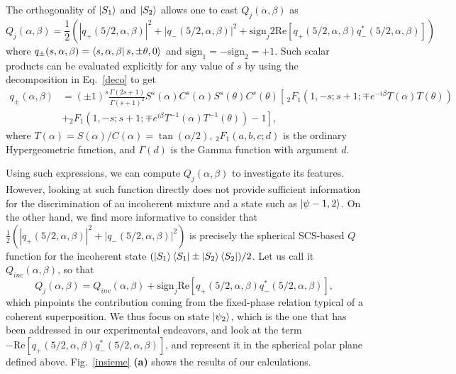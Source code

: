 The orthogonality of $\ket{S_1}$ and $\ket{S_2}$ allows one to cast $Q_j(\alpha,\beta)$ as 
\begin{equation}
Q_j(\alpha,\beta)=\frac12\left(|q_+(5/2,\alpha,\beta)|^2+|q_-(5/2,\alpha,\beta)|^2+\text{sign}_j2\text{Re}[q_+(5/2,\alpha,\beta)q^*_-(5/2,\alpha,\beta)]\right)
\end{equation}
where $q_\pm(s,\alpha,\beta)=\bra{s,\alpha,\beta}{s,\pm\theta,0}\rangle$ and $\text{sign}_1=-\text{sign}_2=+1$. Such scalar products can be evaluated explicitly for any value of $s$ by using the decomposition in Eq.~\eqref{deco} to get 
\begin{equation}
\begin{aligned}
q_\pm(\alpha,\beta)&=(\pm 1)^s\frac{\Gamma (2 s+1)}{\Gamma (s+1)^2} S^s\left({\alpha }\right) C^s\left(\alpha\right) S^s\left(\theta\right) C^s\left({\theta
   }\right) \left[\, _2F_1\left(1,-s;s+1;\mp e^{-i \beta  } T\left({\alpha}\right) T\left({\theta }\right)\right)\right.\\
  &+\left.{}_2F_1\left(1,-s;s+1;\mp e^{i \beta} T^{-1} \left({\alpha}\right) T^{-1}\left({\theta }\right)\right)-1\right],
  \end{aligned}
\end{equation}
where $T(\alpha)=S(\alpha)/C(\alpha)=\tan(\alpha/2)$, $_2F_1(a,b,c;d)$ is the ordinary Hypergeometric function, and $\Gamma(d)$ is the Gamma function with argument $d$.

Using such expressions, we can compute $Q_j(\alpha,\beta)$ to investigate its features. However, looking at such function directly does not provide sufficient information for the discrimination of an incoherent mixture and a state such as $\ket{\psi-{1,2}}$. On the other hand, we find more informative to consider that $\frac12\left(|q_+(5/2,\alpha,\beta)|^2+|q_-(5/2,\alpha,\beta)|^2\right)$ is precisely the spherical SCS-based $Q$ function for the incoherent state $(\ket{S_1}\bra{S_1}\pm\ket{S_2}\bra{S_2})/2$. Let us call it $Q_{inc}(\alpha,\beta)$, so that 
\begin{equation}
Q_j(\alpha,\beta)=Q_{inc}(\alpha,\beta)+\text{sign}_j\text{Re}[q_+(5/2,\alpha,\beta)q^*_-(5/2,\alpha,\beta)],
\end{equation}
which pinpoints the contribution coming from the fixed-phase relation typical of a coherent superposition. We thus focus on state $\ket{\psi_2}$, which is the one that has been addressed in our experimental endeavors, and look at the term $-\text{Re}[q_+(5/2,\alpha,\beta)q^*_-(5/2,\alpha,\beta)]$, and represent it in the spherical polar plane defined above. Fig.~\ref{insieme} {\bf (a)} shows the results of our calculations. 

